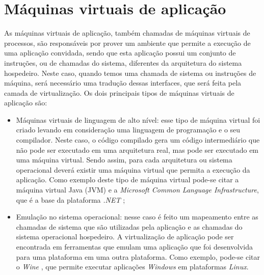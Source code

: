 \section{Máquinas virtuais de aplicação}
\label{section:virtaplicacao}

As máquinas virtuais de aplicação, também chamadas de máquinas virtuais de processos, são responsáveis por prover um ambiente que permite 
a execução de uma aplicação convidada, sendo que esta aplicação possui um conjunto de instruções, ou de chamadas do sistema, diferentes da 
arquitetura do sistema hospedeiro. Neste caso, quando temos uma chamada de sistema ou instruções de máquina, será necessário uma 
tradução dessas interfaces, que será feita pela camada de virtualização. Os dois principais tipos de máquinas virtuais de aplicação são:

\begin{itemize}
 \item Máquinas virtuais de linguagem de alto nível: esse tipo de máquina virtual foi criado levando em consideração uma linguagem de 
 programação e o seu compilador. Neste caso, o código compilado gera um código intermediário que não pode ser executado em uma arquitetura real, 
 mas pode ser executado em uma máquina virtual. Sendo assim, para cada arquitetura ou sistema operacional deverá existir uma máquina virtual que
 permita a execução da aplicação. Como exemplo deste tipo de máquina virtual pode-se citar a máquina virtual Java (\ac{JVM})
 e a \textit{Microsoft Common Language Infrastructure}, que é a base da plataforma \textit{.NET} \cite{carissimi2008};
 \item Emulação no sistema operacional: nesse caso é feito um mapeamento entre as chamadas de sistema que são utilizadas pela aplicação 
 e as chamadas do sistema operacional hospedeiro. A virtualização de aplicação pode ser encontrada em ferramentas que emulam uma aplicação que foi
 desenvolvida para uma plataforma em uma outra plataforma. Como exemplo, pode-se citar o \textit{Wine} \cite{wine}, que permite executar 
 aplicações \textit{Windows} em plataformas \textit{Linux}.
\end{itemize}


